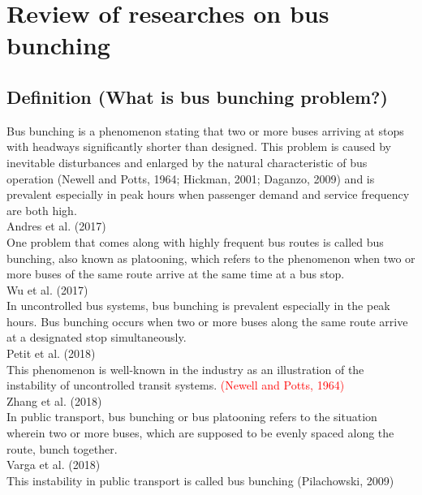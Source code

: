 \documentclass{article}
\begin{document}
\section{Review of researches on bus bunching}

\subsection*{Definition (What is bus bunching problem?)}
Bus bunching is a phenomenon stating that two or more buses 
arriving at stops with headways significantly shorter than designed.
This problem is caused by inevitable disturbances 
and enlarged by the natural characteristic of bus operation 
(Newell and Potts, 1964; Hickman, 2001; Daganzo, 2009)
and is prevalent especially in peak hours 
when passenger demand and service frequency are both high.\\

\noindent \textrm{Andres et al. (2017)}\\
One problem that comes along with highly frequent bus routes is called bus bunching, 
also known as platooning, 
which refers to the phenomenon when two or more buses of the same route arrive at the same time at a bus stop.\\

\noindent \textrm{Wu et al. (2017)}\\
In uncontrolled bus systems, 
bus bunching is prevalent especially in the peak hours.
Bus bunching occurs when two or more buses along the same route 
arrive at a designated stop simultaneously.\\

\noindent \textrm{Petit et al. (2018)}\\
This phenomenon is well-known in the industry 
as an illustration of the instability of uncontrolled transit systems.
\textcolor{red}{\textrm{(Newell and Potts, 1964)}}\\

\noindent \textrm{Zhang et al. (2018)}\\
In public transport, 
bus bunching or bus platooning refers to the situation wherein two or more buses, 
which are supposed to be evenly spaced along the route, 
bunch together.\\

\noindent \textrm{Varga et al. (2018)}\\
This instability in public transport is called bus bunching
\textrm{(Pilachowski, 2009)}\\
\end{document}
